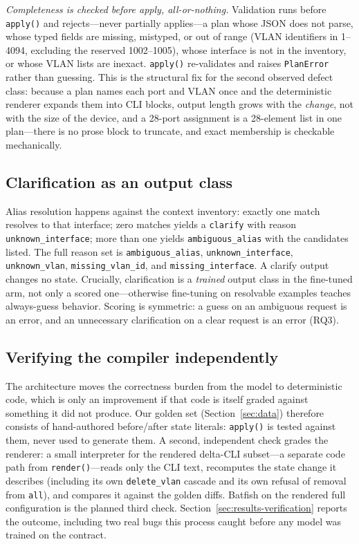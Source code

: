 \documentclass[conference]{IEEEtran}
\begin{document}
\emph{Completeness is checked before apply, all-or-nothing.} Validation runs before \texttt{apply()} and rejects---never partially applies---a plan whose JSON does not parse, whose typed fields are missing, mistyped, or out of range (VLAN identifiers in 1--4094, excluding the reserved 1002--1005), whose interface is not in the inventory, or whose VLAN lists are inexact. \texttt{apply()} re-validates and raises \texttt{PlanError} rather than guessing. This is the structural fix for the second observed defect class: because a plan names each port and VLAN once and the deterministic renderer expands them into CLI blocks, output length grows with the \emph{change}, not with the size of the device, and a 28-port assignment is a 28-element list in one plan---there is no prose block to truncate, and exact membership is checkable mechanically.

\subsection{Clarification as an output class}

Alias resolution happens against the context inventory: exactly one match resolves to that interface; zero matches yields a \texttt{clarify} with reason \texttt{unknown\_interface}; more than one yields \texttt{ambiguous\_alias} with the candidates listed. The full reason set is \texttt{ambiguous\_alias}, \texttt{unknown\_interface}, \texttt{unknown\_vlan}, \texttt{missing\_vlan\_id}, and \texttt{missing\_interface}. A clarify output changes no state. Crucially, clarification is a \emph{trained} output class in the fine-tuned arm, not only a scored one---otherwise fine-tuning on resolvable examples teaches always-guess behavior. Scoring is symmetric: a guess on an ambiguous request is an error, and an unnecessary clarification on a clear request is an error (RQ3).

\subsection{Verifying the compiler independently}

The architecture moves the correctness burden from the model to deterministic code, which is only an improvement if that code is itself graded against something it did not produce. Our golden set (Section~\ref{sec:data}) therefore consists of hand-authored before/after state literals: \texttt{apply()} is tested against them, never used to generate them. A second, independent check grades the renderer: a small interpreter for the rendered delta-CLI subset---a separate code path from \texttt{render()}---reads only the CLI text, recomputes the state change it describes (including its own \texttt{delete\_vlan} cascade and its own refusal of removal from \texttt{all}), and compares it against the golden diffs. Batfish on the rendered full configuration is the planned third check. Section~\ref{sec:results-verification} reports the outcome, including two real bugs this process caught before any model was trained on the contract.
\end{document}
